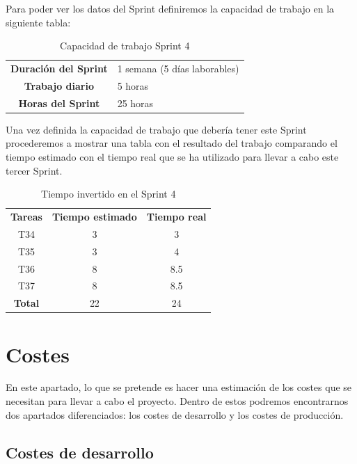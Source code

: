 Para poder ver los datos del Sprint definiremos la capacidad de trabajo en la siguiente tabla:

\begin{table}[H]
	\begin{center}
		\begin{tabular}{| c | p{9cm} |}
			\hline
			
			\textbf{Duración del Sprint} & 1 semana (5 días laborables) \\
			\textbf{Trabajo diario} & 5 horas \\
			\textbf{Horas del Sprint} & 25 horas \\ \hline
		\end{tabular}
		\caption{Capacidad de trabajo Sprint 4}
	\end{center}
\end{table}

Una vez definida la capacidad de trabajo que debería tener este Sprint procederemos a mostrar una tabla con el resultado del trabajo comparando el tiempo estimado con el tiempo real que se ha utilizado para llevar a cabo este tercer Sprint.

\begin{table}[H]
	\begin{center}
		\begin{tabular}{| c | c | c |}
			\hline
			
			\textbf{Tareas} & \textbf{Tiempo estimado} & \textbf{Tiempo real} \\
			T34 & 3 & 3 \\
			T35 & 3 & 4 \\
			T36 & 8 & 8.5 \\
			T37 & 8 & 8.5 \\
			\textbf{Total} & 22 & 24 \\ \hline
		\end{tabular}
		\caption{Tiempo invertido en el Sprint 4}
	\end{center}
\end{table} 

\section{Costes}

En este apartado, lo que se pretende es hacer una estimación de los costes que se necesitan para llevar a cabo el proyecto. Dentro de estos podremos encontrarnos dos apartados diferenciados: los costes de desarrollo y los costes de producción.

\subsection{Costes de desarrollo}

